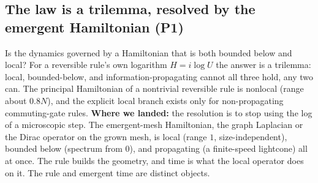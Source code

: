 \subsection{The law is a trilemma, resolved by the emergent Hamiltonian (P1)}

Is the dynamics governed by a Hamiltonian that is both bounded below and local? For a
reversible rule's own logarithm $H = i \log U$ the answer is a trilemma: local,
bounded-below, and information-propagating cannot all three hold, any two can. The
principal Hamiltonian of a nontrivial reversible rule is nonlocal (range about $0.8N$),
and the explicit local branch exists only for non-propagating commuting-gate rules.
\textbf{Where we landed:} the resolution is to stop using the log of a microscopic step.
The emergent-mesh Hamiltonian, the graph Laplacian or the Dirac operator on the grown
mesh, is local (range $1$, size-independent), bounded below (spectrum from $0$), and
propagating (a finite-speed lightcone) all at once. The rule builds the geometry, and
time is what the local operator does on it. The rule and emergent time are distinct
objects.
